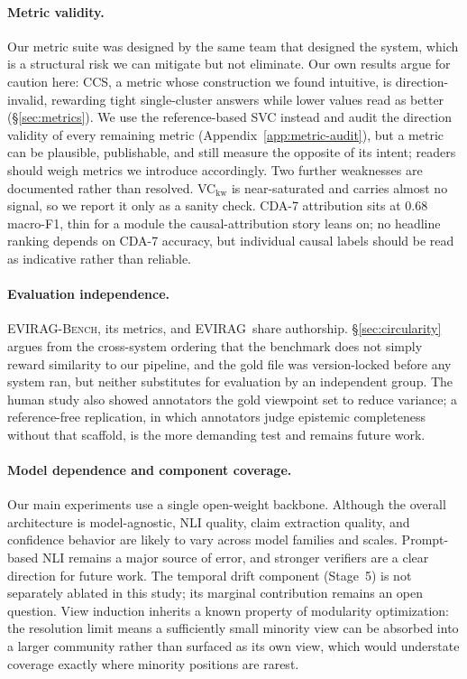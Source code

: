 \documentclass[11pt]{article}
\newcommand{\system}{\textsc{EVIRAG}\xspace}
\newcommand{\bench}{\textsc{EVIRAG-Bench}\xspace}
\begin{document}
\paragraph{Metric validity.}
Our metric suite was designed by the same team that designed the system, which
is a structural risk we can mitigate but not eliminate.  Our own results argue
for caution here: CCS, a metric whose construction we found intuitive, is
direction-invalid, rewarding tight single-cluster answers while lower values
read as better (\S\ref{sec:metrics}).  We use the reference-based SVC instead
and audit the direction validity of every remaining metric
(Appendix~\ref{app:metric-audit}), but a metric can be plausible, publishable,
and still measure the opposite of its intent; readers should weigh metrics we
introduce accordingly.  Two further weaknesses are documented rather than resolved.
VC$_\text{kw}$ is near-saturated and carries almost no signal, so we report it
only as a sanity check.  CDA-7 attribution sits at $0.68$ macro-F1, thin for a
module the causal-attribution story leans on; no headline ranking depends on
CDA-7 accuracy, but individual causal labels should be read as indicative
rather than reliable.

\paragraph{Evaluation independence.}
\bench, its metrics, and \system\ share authorship.  \S\ref{sec:circularity}
argues from the cross-system ordering that the benchmark does not simply reward
similarity to our pipeline, and the gold file was version-locked before any
system ran, but neither substitutes for evaluation by an independent group.
The human study also showed annotators the gold viewpoint set to reduce
variance; a reference-free replication, in which annotators judge epistemic
completeness without that scaffold, is the more demanding test and remains
future work.

\paragraph{Model dependence and component coverage.}
Our main experiments use a single open-weight backbone.  Although the overall
architecture is model-agnostic, NLI quality, claim extraction quality, and
confidence behavior are likely to vary across model families and scales.
Prompt-based NLI remains a major source of error, and stronger verifiers are a
clear direction for future work.  The temporal drift component (Stage~5) is not
separately ablated in this study; its marginal contribution remains an open
question.  View induction inherits a known property of modularity
optimization: the resolution limit \citep{fortunato2007resolution} means a
sufficiently small minority view can be absorbed into a larger community rather
than surfaced as its own view, which would understate coverage exactly where
minority positions are rarest.
\end{document}
